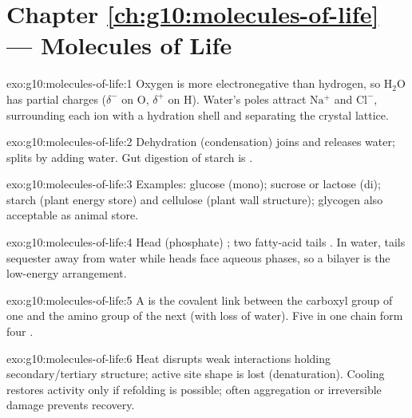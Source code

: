 \section*{Chapter \ref{ch:g10:molecules-of-life} --- Molecules of Life}

\begin{solution}{exo:g10:molecules-of-life:1}
Oxygen is more electronegative than hydrogen, so $\mathrm{H_2O}$ has
partial charges ($\delta^-$ on O, $\delta^+$ on H). Water's poles attract
$\mathrm{Na^+}$ and $\mathrm{Cl^-}$, surrounding each ion with a hydration
shell and separating the crystal lattice.
\end{solution}

\begin{solution}{exo:g10:molecules-of-life:2}
Dehydration (condensation) joins  and releases water; 
splits  by adding water. Gut digestion of starch is .
\end{solution}

\begin{solution}{exo:g10:molecules-of-life:3}
Examples: glucose (mono); sucrose or lactose (di); starch (plant energy
store) and cellulose (plant wall structure); glycogen also acceptable as
animal store.
\end{solution}

\begin{solution}{exo:g10:molecules-of-life:4}
Head (phosphate) ; two fatty-acid tails . In water,
tails sequester away from water while heads face aqueous phases, so a
bilayer is the low-energy arrangement.
\end{solution}

\begin{solution}{exo:g10:molecules-of-life:5}
A  is the covalent link between the carboxyl group of one
 and the amino group of the next (with loss of water). Five
 in one chain form four .
\end{solution}

\begin{solution}{exo:g10:molecules-of-life:6}
Heat disrupts weak interactions holding secondary/tertiary structure;
active site shape is lost (denaturation). Cooling restores activity only
if refolding is possible; often aggregation or irreversible damage
prevents recovery.
\end{solution}

